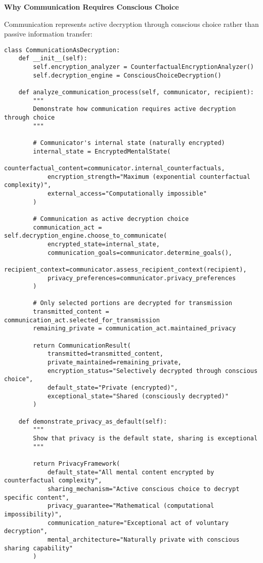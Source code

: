 \documentclass[12pt,a4paper]{article}
\begin{document}
\textbf{Why Communication Requires Conscious Choice}

Communication represents active decryption through conscious choice rather than passive information transfer:

\begin{lstlisting}[style=pythonstyle, caption=Communication as Active Decryption Process]
class CommunicationAsDecryption:
    def __init__(self):
        self.encryption_analyzer = CounterfactualEncryptionAnalyzer()
        self.decryption_engine = ConsciousChoiceDecryption()
        
    def analyze_communication_process(self, communicator, recipient):
        """
        Demonstrate how communication requires active decryption through choice
        """
        
        # Communicator's internal state (naturally encrypted)
        internal_state = EncryptedMentalState(
            counterfactual_content=communicator.internal_counterfactuals,
            encryption_strength="Maximum (exponential counterfactual complexity)",
            external_access="Computationally impossible"
        )
        
        # Communication as active decryption choice
        communication_act = self.decryption_engine.choose_to_communicate(
            encrypted_state=internal_state,
            communication_goals=communicator.determine_goals(),
            recipient_context=communicator.assess_recipient_context(recipient),
            privacy_preferences=communicator.privacy_preferences
        )
        
        # Only selected portions are decrypted for transmission
        transmitted_content = communication_act.selected_for_transmission
        remaining_private = communication_act.maintained_privacy
        
        return CommunicationResult(
            transmitted=transmitted_content,
            private_maintained=remaining_private,
            encryption_status="Selectively decrypted through conscious choice",
            default_state="Private (encrypted)",
            exceptional_state="Shared (consciously decrypted)"
        )
    
    def demonstrate_privacy_as_default(self):
        """
        Show that privacy is the default state, sharing is exceptional
        """
        
        return PrivacyFramework(
            default_state="All mental content encrypted by counterfactual complexity",
            sharing_mechanism="Active conscious choice to decrypt specific content",
            privacy_guarantee="Mathematical (computational impossibility)",
            communication_nature="Exceptional act of voluntary decryption",
            mental_architecture="Naturally private with conscious sharing capability"
        )
\end{lstlisting}
\end{document}
